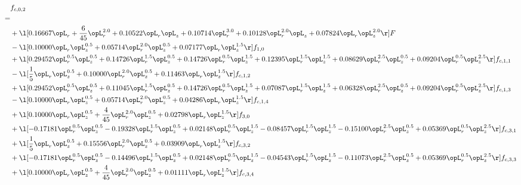 \begin{alignat}{2} 
\label{eq:f_02_2} 
& f_{c,0,2} \nonumber \\ 
 = \\ 
& + \l[  0.16667 \opL_r + \frac{6}{45} \opL_r^{2.0} +  0.10522 \opL_r \opL_z +  0.10714 \opL_r^{3.0} +  0.10128 \opL_r^{2.0} \opL_z +  0.07824 \opL_r \opL_z^{2.0}  \r] F \nonumber \\ 
& - \l[  0.10000 \opL_r \opL_z^{0.5} +  0.05714 \opL_r^{2.0} \opL_z^{0.5} +  0.07177 \opL_r \opL_z^{1.5}  \r] f_{1,0} \nonumber \\ 
& + \l[  0.29452 \opL_r^{0.5} \opL_z^{0.5} +  0.14726 \opL_r^{1.5} \opL_z^{0.5} +  0.14726 \opL_r^{0.5} \opL_z^{1.5} +  0.12395 \opL_r^{1.5} \opL_z^{1.5} +  0.08629 \opL_r^{2.5} \opL_z^{0.5} +  0.09204 \opL_r^{0.5} \opL_z^{2.5}  \r] f_{c,1,1} \nonumber \\ 
& - \l[ \frac{1}{5} \opL_r \opL_z^{0.5} +  0.10000 \opL_r^{2.0} \opL_z^{0.5} +  0.11463 \opL_r \opL_z^{1.5}  \r] f_{c,1,2} \nonumber \\ 
& + \l[  0.29452 \opL_r^{0.5} \opL_z^{0.5} +  0.11045 \opL_r^{1.5} \opL_z^{0.5} +  0.14726 \opL_r^{0.5} \opL_z^{1.5} +  0.07087 \opL_r^{1.5} \opL_z^{1.5} +  0.06328 \opL_r^{2.5} \opL_z^{0.5} +  0.09204 \opL_r^{0.5} \opL_z^{2.5}  \r] f_{c,1,3} \nonumber \\ 
& - \l[  0.10000 \opL_r \opL_z^{0.5} +  0.05714 \opL_r^{2.0} \opL_z^{0.5} +  0.04286 \opL_r \opL_z^{1.5}  \r] f_{c,1,4} \nonumber \\ 
& + \l[  0.10000 \opL_r \opL_z^{0.5} + \frac{4}{45} \opL_r^{2.0} \opL_z^{0.5} +  0.02798 \opL_r \opL_z^{1.5}  \r] f_{3,0} \nonumber \\ 
& + \l[  -0.17181 \opL_r^{0.5} \opL_z^{0.5}   -0.19328 \opL_r^{1.5} \opL_z^{0.5} +  0.02148 \opL_r^{0.5} \opL_z^{1.5}   -0.08457 \opL_r^{1.5} \opL_z^{1.5}   -0.15100 \opL_r^{2.5} \opL_z^{0.5} +  0.05369 \opL_r^{0.5} \opL_z^{2.5}  \r] f_{c,3,1} \nonumber \\ 
& + \l[ \frac{1}{5} \opL_r \opL_z^{0.5} +  0.15556 \opL_r^{2.0} \opL_z^{0.5} +  0.03909 \opL_r \opL_z^{1.5}  \r] f_{c,3,2} \nonumber \\ 
& + \l[  -0.17181 \opL_r^{0.5} \opL_z^{0.5}   -0.14496 \opL_r^{1.5} \opL_z^{0.5} +  0.02148 \opL_r^{0.5} \opL_z^{1.5}   -0.04543 \opL_r^{1.5} \opL_z^{1.5}   -0.11073 \opL_r^{2.5} \opL_z^{0.5} +  0.05369 \opL_r^{0.5} \opL_z^{2.5}  \r] f_{c,3,3} \nonumber \\ 
& + \l[  0.10000 \opL_r \opL_z^{0.5} + \frac{4}{45} \opL_r^{2.0} \opL_z^{0.5} +  0.01111 \opL_r \opL_z^{1.5}  \r] f_{c,3,4} \nonumber \\ 

\end{alignat}
